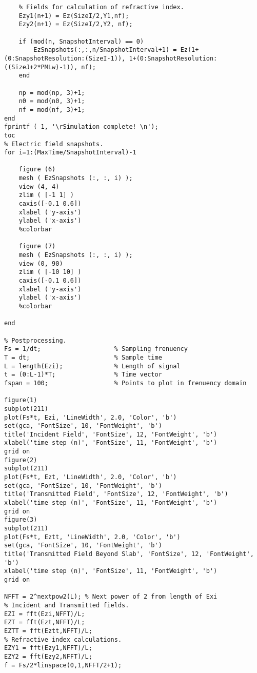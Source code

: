 \begin{lstlisting}
    % Fields for calculation of refractive index.
    Ezy1(n+1) = Ez(SizeI/2,Y1,nf);
    Ezy2(n+1) = Ez(SizeI/2,Y2, nf);
    
    if (mod(n, SnapshotInterval) == 0)
        EzSnapshots(:,:,n/SnapshotInterval+1) = Ez(1+(0:SnapshotResolution:(SizeI-1)), 1+(0:SnapshotResolution:((SizeJ+2*PMLw)-1)), nf);
    end

    np = mod(np, 3)+1;
    n0 = mod(n0, 3)+1;
    nf = mod(nf, 3)+1;
end
fprintf ( 1, '\rSimulation complete! \n');
toc
% Electric field snapshots.
for i=1:(MaxTime/SnapshotInterval)-1

    figure (6)
    mesh ( EzSnapshots (:, :, i) );
    view (4, 4)
    zlim ( [-1 1] )
    caxis([-0.1 0.6])
    xlabel ('y-axis')
    ylabel ('x-axis')
    %colorbar

    figure (7)
    mesh ( EzSnapshots (:, :, i) );
    view (0, 90)
    zlim ( [-10 10] )
    caxis([-0.1 0.6])
    xlabel ('y-axis')
    ylabel ('x-axis')
    %colorbar

end

% Postprocessing.
Fs = 1/dt;                    % Sampling frenuency
T = dt;                       % Sample time
L = length(Ezi);              % Length of signal
t = (0:L-1)*T;                % Time vector
fspan = 100;                  % Points to plot in frenuency domain

figure(1)
subplot(211)
plot(Fs*t, Ezi, 'LineWidth', 2.0, 'Color', 'b')
set(gca, 'FontSize', 10, 'FontWeight', 'b')
title('Incident Field', 'FontSize', 12, 'FontWeight', 'b')
xlabel('time step (n)', 'FontSize', 11, 'FontWeight', 'b')
grid on
figure(2)
subplot(211)
plot(Fs*t, Ezt, 'LineWidth', 2.0, 'Color', 'b')
set(gca, 'FontSize', 10, 'FontWeight', 'b')
title('Transmitted Field', 'FontSize', 12, 'FontWeight', 'b')
xlabel('time step (n)', 'FontSize', 11, 'FontWeight', 'b')
grid on
figure(3)
subplot(211)
plot(Fs*t, Eztt, 'LineWidth', 2.0, 'Color', 'b')
set(gca, 'FontSize', 10, 'FontWeight', 'b')
title('Transmitted Field Beyond Slab', 'FontSize', 12, 'FontWeight', 'b')
xlabel('time step (n)', 'FontSize', 11, 'FontWeight', 'b')
grid on

NFFT = 2^nextpow2(L); % Next power of 2 from length of Exi
% Incident and Transmitted fields.
EZI = fft(Ezi,NFFT)/L;
EZT = fft(Ezt,NFFT)/L;
EZTT = fft(Eztt,NFFT)/L;
% Refractive index calculations.
EZY1 = fft(Ezy1,NFFT)/L;
EZY2 = fft(Ezy2,NFFT)/L;
f = Fs/2*linspace(0,1,NFFT/2+1);


\end{lstlisting}
